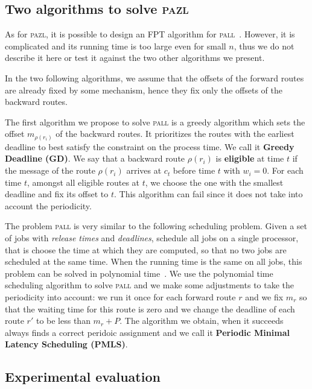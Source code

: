 \documentclass[a4paper,10pt]{IEEEtran}
\newcommand\pazl{\textsc{pazl}\xspace}
\newcommand\pall{\textsc{pall}\xspace}
\begin{document}
  \subsection{Two algorithms to solve \pazl}
  
  As for \pazl, it is possible to design an FPT algorithm for \pall~\cite{versionlongue}. 
  However, it is complicated and its running time is too large even for small $n$,
  thus we do not describe it here or test it against the two other algorithms we present.
  
  In the two following algorithms, we assume that the offsets of the forward routes are already fixed by some mechanism, hence they fix only the offsets of the backward routes. 
    
    The first algorithm we propose to solve \pall is a greedy algorithm which sets the offset $m_{\rho(r_i)}$ of the 
    backward routes. It prioritizes the routes with the earliest deadline to best satisfy the
    constraint on the process time. We call it \textbf{Greedy Deadline (GD)}. We say that a backward route $\rho(r_i)$ is {\bf eligible} at time $t$ if the message of the route $\rho(r_i)$ arrives at $c_t$ before time $t$ with $w_i = 0$. For each time $t$, amongst all eligible routes at $t$, we choose the one with the smallest deadline and fix its offset to $t$.
    This algorithm can fail since it does not take into account the periodicity.
    
     The problem \pall is very similar to the following scheduling problem. Given a set of jobs with \emph{release times} and  \emph{deadlines}, schedule all jobs on a single processor, that is choose the time at which they are computed, so that no two jobs are scheduled at the same time. When the running time is the same on all jobs, this problem can be solved in polynomial time~\cite{simons1978fast}. We use the polynomial time scheduling algorithm to solve \pall and we make some adjustments to take the periodicity into account: we run it once for each forward route $r$ and we fix $m_r$ so that the waiting time for this route is zero and we change the deadline of each route $r'$ to be less than $m_{r} + P$. The algorithm we obtain, when it succeeds always finds a correct peridoic assignment and we call it {\bf Periodic Minimal Latency Scheduling (PMLS)}.

     
    \subsection{Experimental evaluation}
    \label{sec:resultsPALL}
    
\end{document}

